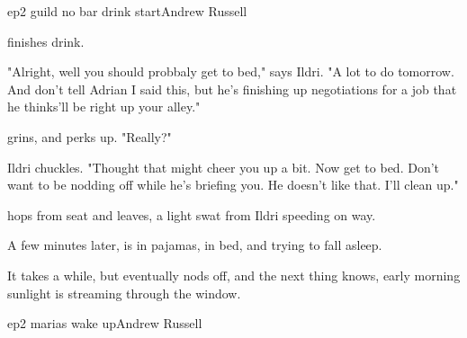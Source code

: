 \documentclass{book}
\begin{document}
\begin{childnode}{ep2 guild no bar drink start}{Andrew Russell}



     \name{} finishes \hisher{} drink.

    "Alright, well you should probbaly get to bed," says Ildri. "A lot to do tomorrow. And don't tell Adrian I said this, but he's finishing up negotiations for a job that he thinks'll be right up your alley."

    \name{} grins, and perks up. "Really?"

    Ildri chuckles. "Thought that might cheer you up a bit. Now get to bed. Don't want to be nodding off while he's briefing you. He doesn't like that. I'll clean up."

    \name{} hops from \hisher{} seat and leaves, a light swat from Ildri speeding \himher{} on \hisher{} way.

    A few minutes later, \heshe{} is in \hisher{} pajamas, in bed, and trying to fall asleep.

    It takes a while, but eventually \name{} nods off, and the next thing \heshe{} knows, early morning sunlight is streaming through the window.

\end{childnode}

\begin{childnode}{ep2 marias wake up}{Andrew Russell}




\end{childnode}
\end{document}
